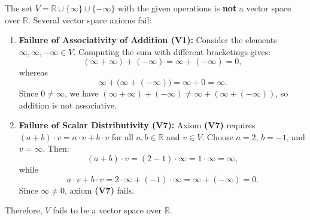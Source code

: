 \begin{exercisesolution*}
\label{sol:extended_reals_not_vector_space}
The set $V = \mathbb{R} \cup \{\infty\} \cup \{-\infty\}$ with the given operations is \textbf{not} a vector space over $\mathbb{R}$. Several vector space axioms fail:

\begin{enumerate}[label=\textbf{(\alph*)}]
    \item \textbf{Failure of Associativity of Addition \textbf{(V1)}:}
    Consider the elements $\infty, \infty, -\infty \in V$. Computing the sum with different bracketings gives:
    \[
    (\infty + \infty) + (-\infty) = \infty + (-\infty) = 0,
    \]
    whereas
    \[
    \infty + \bigl(\infty + (-\infty)\bigr) = \infty + 0 = \infty.
    \]
    Since $0 \ne \infty$, we have $(\infty + \infty) + (-\infty) \ne \infty + (\infty + (-\infty))$, so addition is not associative.

    \item \textbf{Failure of Scalar Distributivity \textbf{(V7)}:}
    Axiom \textbf{(V7)} requires $(a + b) \cdot v = a \cdot v + b \cdot v$ for all $a, b \in \mathbb{R}$ and $v \in V$. Choose $a = 2$, $b = -1$, and $v = \infty$. Then:
    \[
    (a + b) \cdot v = (2 - 1) \cdot \infty = 1 \cdot \infty = \infty,
    \]
    while
    \[
    a \cdot v + b \cdot v = 2 \cdot \infty + (-1) \cdot \infty = \infty + (-\infty) = 0.
    \]
    Since $\infty \ne 0$, axiom \textbf{(V7)} fails.
\end{enumerate}
Therefore, $V$ fails to be a vector space over $\mathbb{R}$.
\end{exercisesolution*}

